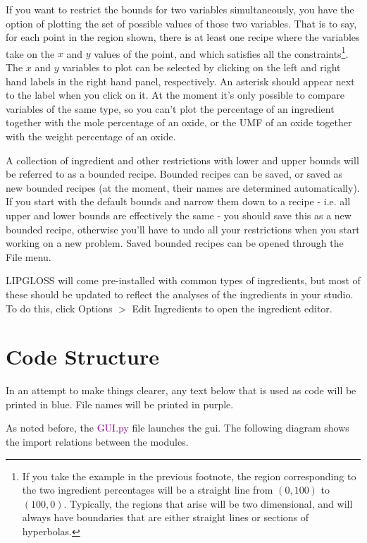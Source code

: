 \documentclass[a4paper,10pt]{article}
\def\green{\textcolor{Purple}}
\begin{document}
If you want to restrict the bounds for two variables simultaneously, you have the option of plotting the set of possible values of those two variables. That is to say, for each point in the region shown, there is at least one recipe where the variables take on the $x$ and $y$ values of the point, and which satisfies all the constraints\footnote{If you take the example in the previous footnote, the region corresponding to the two ingredient percentages will be a straight line from $(0,100)$ to $(100,0)$. Typically, the regions that arise will be two dimensional, and will always have boundaries that are either straight lines or sections of hyperbolas.}. The $x$ and $y$ variables to plot can be selected by clicking on the left and right hand labels in the right hand panel, respectively. An asterisk should appear next to the label when you click on it. At the moment it's only possible to compare variables of the same type, so you can't plot the percentage of an ingredient together with the mole percentage of an oxide, or the UMF of an oxide together with the weight percentage of an oxide.

A collection of ingredient and other restrictions with lower and upper bounds will be referred to as a bounded recipe. Bounded recipes can be saved, or saved as new bounded recipes (at the moment, their names are determined automatically). If you start with the default bounds and narrow them down to a recipe - i.e. all upper and lower bounds are effectively the same - you should save this as a new bounded recipe, otherwise you'll have to undo all your restrictions when you start working on a new problem. Saved bounded recipes can be opened through the File menu.

LIPGLOSS will come pre-installed with common types of ingredients, but most of these should be updated to reflect the analyses of the ingredients in your studio. To do this, click Options $>$ Edit Ingredients to open the ingredient editor.

\section{Code Structure}
In an attempt to make things clearer, any text below that is used as code will be printed in blue. File names will be printed in purple.

As noted before, the \green{GUI.py} file launches the gui. The following diagram shows the import relations between the modules.
\end{document}
